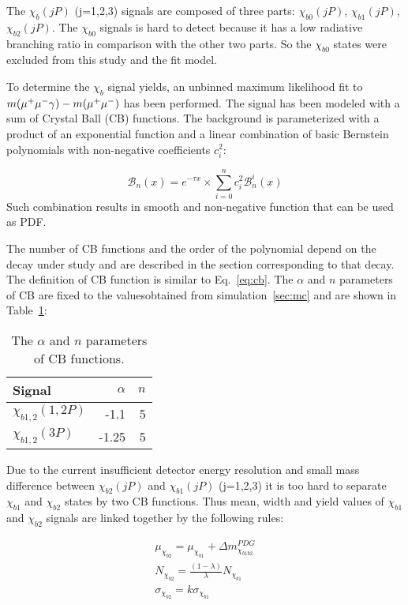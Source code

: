 The $\chi_b(jP)$ (j=1,2,3) signals are composed of three parts: $\chi_{b0}(jP)$,
$\chi_{b1}(jP)$, $\chi_{b2}(jP)$. The $\chi_{b0}$ signals is hard to detect
because it has a low radiative branching ratio in comparison with the other two
parts. So the $\chi_{b0}$ states were excluded from this study and the fit
model.

To determine the $\chi_b$ signal yields, an unbinned maximum likelihood fit to
$m(\mu^+\mu^-\gamma) - m(\mu^+\mu^-)$ has been performed. The signal has been modeled with
a sum of Crystal Ball (CB)  functions. The background is parameterized with a
product of an exponential function and a linear combination of basic Bernstein
polynomials with non-negative coefficients $c_{i}^2$:

\begin{equation}
\label{eq:bernstein}
{\mathscr B}_{n}(x) = e^{-\tau x} \times \sum_{i=0}^{n} c_{i}^2 {\mathscr B}_{n}^{i}(x)
\end{equation}
Such combination results in smooth and non-negative function that can be used as
PDF.


The number of CB functions and the order of the polynomial depend on the decay
under study and are described in the section corresponding to that decay. The
definition of CB function is similar to Eq.~\ref{eq:cb}. The $\alpha$ and $n$
parameters of CB are fixed to the valuesobtained from simulation~\ref{sec:mc} and
are shown in Table~\ref{tab:chib:fit:tail}:

\begin{table}[H]
\caption{\small   The $\alpha$ and $n$ parameters of CB functions.}
\centering
\begin{tabular}{lrr}
\toprule
Signal & $\alpha$ & $n$ \\
\midrule
$\chi_{b1,2}(1,2P)$ & -1.1 & 5 \\
$\chi_{b1,2}(3P)$ & -1.25 & 5 \\
\bottomrule
\end{tabular}
\label{tab:chib:fit:tail}
\end{table}

Due to the current insufficient detector energy resolution and small mass
difference between $\chi_{b2}(jP)$ and $\chi_{b1}(jP)$ (j=1,2,3) it is too hard
to separate $\chi_{b1}$ and $\chi_{b2}$ states by two CB functions. Thus mean,
width and yield values of  $\chi_{b1}$ and $\chi_{b2}$ signals are linked
together by the following rules:

\begin{equation}
  \begin{aligned}
\mu_{\chi_{b2}} = \mu_{\chi_{b1}} + \Delta m_{\chi_{b1b2}}^{PDG} \\
N_{\chi_{b2}} = \frac{(1-\lambda)}{\lambda} N_{\chi_{b1}} \\
\sigma_{\chi_{b2}} = k \sigma_{\chi_{b1}}
  \end{aligned}
\end{equation}

